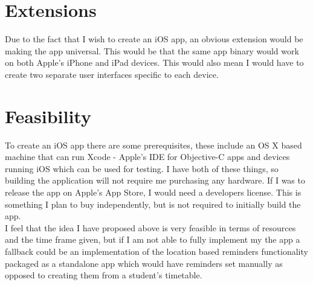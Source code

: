 \documentclass[12pt]{article}
\begin{document}
\section*{Extensions}
	Due to the fact that I wish to create an iOS app, an obvious extension would be making the app universal. This would be that the same app binary would work on both Apple's iPhone and iPad devices. This would also mean I would have to create two separate user interfaces specific to each device.

\section*{Feasibility}
	To create an iOS app there are some prerequisites, these include an OS X based machine that can run Xcode - Apple's IDE for Objective-C apps and devices running iOS which can be used for testing. I have both of these things, so building the application will not require me purchasing any hardware. If I was to release the app on Apple's App Store, I would need a developers license. This is something I plan to buy independently, but is not required to initially build the app.\\	I feel that the idea I have proposed above is very feasible in terms of resources and the time frame given, but if I am not able to fully implement my the app a fallback could be an implementation of the location based reminders functionality packaged as a standalone app which would have reminders set manually as opposed to creating them from a student's timetable. 
\end{document}
